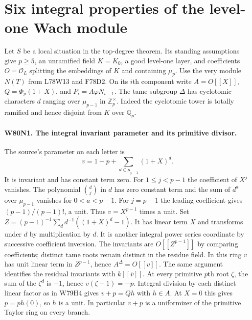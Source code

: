 \section{Six integral properties of the level-one Wach module}

Let $S$ be a local situation in the top-degree theorem. Its standing
assumptions give $p\ge5$, an unramified field $K=K_0$, a good
level-one layer, and coefficients $O=\mathcal O_L$ splitting the
embeddings of $K$ and containing $\mu_p$. Use the very module $N(T)$
from L78W13 and F78D2. On its $i$th component write $A=O[[X]]$,
$Q=\Phi_p(1+X)$, and $P_i=A\varphi N_{i-1}$. The tame subgroup
$\Delta$ has cyclotomic characters $d$ ranging over $\mu_{p-1}$ in
$\mathbb Z_p^\times$. Indeed the cyclotomic tower is totally ramified
and hence disjoint from $K$ over $\mathbb Q_p$.

\paragraph{W80N1. The integral invariant parameter and its primitive divisor.}
The source's parameter on each letter is
\[
 v=1-p+\sum_{d\in\mu_{p-1}}(1+X)^d.
\]
It is invariant and has constant term zero. For $1\le j<p-1$ the
coefficient of $X^j$ vanishes. The polynomial $\binom{d}{j}$ in $d$
has zero constant term and the sum of $d^a$ over $\mu_{p-1}$ vanishes
for $0<a<p-1$. For $j=p-1$ the leading coefficient gives
$(p-1)/(p-1)!$, a unit. Thus $v=X^{p-1}$ times a unit.
Set $Z=(p-1)^{-1}\sum_d d^{-1}((1+X)^d-1)$. It has linear term
$X$ and transforms under $d$ by multiplication by $d$. It is another
integral power series coordinate by successive coefficient inversion.
The invariants are $O[[Z^{p-1}]]$ by comparing coefficients; distinct
tame roots remain distinct in the residue field. In this ring $v$
has unit linear term in $Z^{p-1}$, hence $A^\Delta=O[[v]]$.
The same argument identifies the residual invariants with $k[[\bar v]]$.
At every primitive $p$th root $\zeta$, the sum of the $\zeta^d$ is
$-1$, hence $v(\zeta-1)=-p$. Integral division by each distinct linear
factor as in W79H4 gives $v+p=Qh$ with $h\in A$. At $X=0$ this gives
$p=ph(0)$, so $h$ is a unit. In particular $v+p$ is a uniformizer
of the primitive Taylor ring on every branch.

